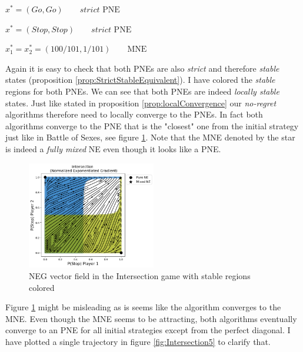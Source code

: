 \begin{description}\centering
    \item $x^{*} = (Go,Go) \qquad \textit{strict }\text{PNE}$
    \item $x^{*} = (Stop,Stop) \qquad \textit{strict }\text{PNE}$
    \item $x_{1}^* = x_{2}^* = (100/101,1/101) \qquad \text{MNE}$
\end{description}

Again it is easy to check that both PNEs are also \textit{strict} and therefore \textit{stable} states (proposition \ref{prop:StrictStableEquivalent}). I have colored the \textit{stable} regions for both PNEs. We can see that both PNEs are indeed \textit{locally stable} states. Just like stated in proposition \ref{prop:localConvergence} our \textit{no-regret} algorithms therefore need to locally converge to the PNEs. In fact both algorithms converge to the PNE that is the "closest" one from the initial strategy just like in Battle of Sexes, see figure \ref{fig:Intersection4}. Note that the MNE denoted by the star is indeed a \textit{fully mixed} NE even though it looks like a PNE.

\begin{figure}[H]
    \centering
    \includegraphics[width=0.5\textwidth]{logos/Intersection4.png}
    \caption{NEG vector field in the Intersection game with stable regions colored}
    \label{fig:Intersection4}
\end{figure}

Figure \ref{fig:Intersection4} might be misleading as is seems like the algorithm converges to the MNE. Even though the MNE seems to be attracting, both algorithms eventually converge to an PNE for all initial strategies except from the perfect diagonal. I have plotted a single trajectory in figure \ref{fig:Intersection5} to clarify that. 

